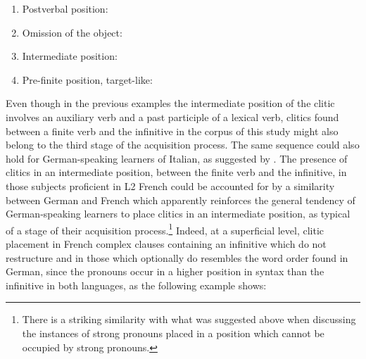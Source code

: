\documentclass[output=paper,modfonts,nonflat,newtxmath]{langsci/langscibook}
\begin{document}
\begin{enumerate}
\item Postverbal position:
	  \label{ex:sciutti:41}
 		\z





\item Omission of the object:

			\z


\item Intermediate position:

		\z

\item Pre-finite position, target-like:%
				\z

\end{enumerate}

Even though in the previous examples the intermediate position of the clitic involves an auxiliary verb and a past participle of a lexical verb, clitics found between a finite verb and the infinitive in the corpus of this study might also belong to the third stage of the acquisition process. The same sequence could also hold for German-speaking learners of Italian, as suggested by \citet{HamannBelletti2006}. The presence of clitics in an intermediate position, between the finite verb and the infinitive, in those subjects proficient in L2 French could be accounted for by a similarity between German and French which apparently reinforces the general tendency of German-speaking learners to place clitics in an intermediate position, as typical of a stage of their acquisition process.\footnote{ \textrm{There is a striking similarity with what was suggested above when discussing the instances of strong pronouns placed in a position which cannot be occupied by strong pronouns.}} Indeed, at a superficial level, clitic placement in French complex clauses containing an infinitive which do not restructure and in those which optionally do resembles the word order found in German, since the pronouns occur in a higher position in syntax than the infinitive in both languages, as the following example shows:
\end{document}
